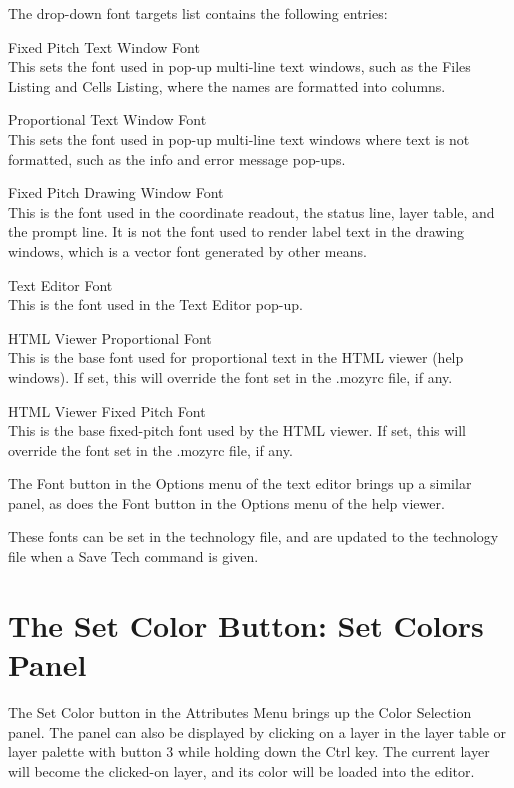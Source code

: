 The drop-down font targets list contains the following entries:
\begin{description}
\item{\cb Fixed Pitch Text Window Font}\\
This sets the font used in pop-up multi-line text windows, such as the
{\cb Files Listing} and {\cb Cells Listing}, where the names are
formatted into columns.

\item{\cb Proportional Text Window Font}\\
This sets the font used in pop-up multi-line text windows where text
is not formatted, such as the info and error message pop-ups.

\item{\cb Fixed Pitch Drawing Window Font}\\
This is the font used in the coordinate readout, the status line,
layer table, and the prompt line.  It is not the font used to render
label text in the drawing windows, which is a vector font generated by
other means.

\item{\cb Text Editor Font}\\
This is the font used in the {\cb Text Editor} pop-up.

\item{\cb HTML Viewer Proportional Font}\\
This is the base font used for proportional text in the HTML viewer
(help windows).  If set, this will override the font set in the {\vt
.mozyrc} file, if any.

\item{\cb HTML Viewer Fixed Pitch Font}\\
This is the base fixed-pitch font used by the HTML viewer.  If set,
this will override the font set in the {\vt .mozyrc} file, if any.
\end{description}

The {\cb Font} button in the {\cb Options} menu of the text editor
brings up a similar panel, as does the {\cb Font} button in the {\cb
Options} menu of the help viewer.

These fonts can be set in the technology file, and are updated to
the technology file when a {\cb Save Tech} command is given.


\section{The {\cb Set Color} Button: Set Colors Panel}
The {\cb Set Color} button in the {\cb Attributes Menu} brings up the
{\cb Color Selection} panel.  The panel can also be displayed by
clicking on a layer in the layer table or layer palette with button 3
while holding down the {\kb Ctrl} key.  The current layer will become
the clicked-on layer, and its color will be loaded into the editor.

